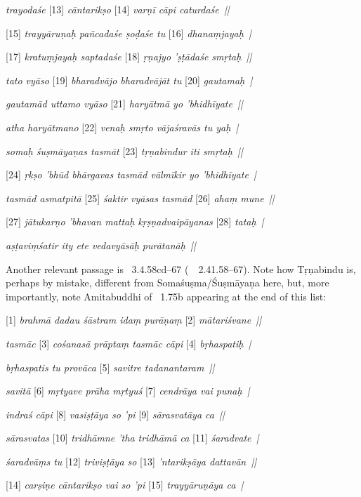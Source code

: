 {{  \textit{trayodaśe }[13]\textit{ cāntarikṣo }[14]\textit{ varṇī cāpi caturdaśe~|| } 
 
  [15]\textit{ trayyāruṇaḥ pañcadaśe ṣoḍaśe tu }[16]\textit{ dhanaṃjayaḥ~| } 
 
  [17]\textit{ kratuṃjayaḥ saptadaśe }[18]\textit{ ṛṇajyo 'ṣṭādaśe smṛtaḥ~|| } 
 
  \textit{tato vyāso }[19]\textit{ bharadvājo bharadvājāt tu }[20]\textit{ gautamaḥ~| } 
 
  \textit{gautamād uttamo vyāso }[21]\textit{ haryātmā yo 'bhidhīyate~|| } 
 
  \textit{atha haryātmano }[22]\textit{ venaḥ smṛto vājaśravās tu yaḥ~| } 
 
  \textit{somaḥ śuṣmāyaṇas tasmāt }[23]\textit{ tṛṇabindur iti smṛtaḥ~|| } 
 
  [24]\textit{ ṛkṣo 'bhūd bhārgavas tasmād vālmīkir yo 'bhidhīyate~| } 
 
  \textit{tasmād asmatpitā }[25]\textit{ śaktir vyāsas tasmād }[26]\textit{ ahaṃ mune~|| } 
 
  [27]\textit{ jātukarṇo 'bhavan mattaḥ kṛṣṇadvaipāyanas }[28]\textit{ tataḥ~| } 
 
  \textit{aṣṭaviṃśatir ity ete vedavyāsāḥ purātanāḥ~|| }
 
  
 
  Another relevant passage is \BRAHMANDAPUR\ 3.4.58cd--67 {\rm (}\similar\ \VAYUP\ 2.41.58--67{\rm )}.
  Note how Tṛṇabindu is, perhaps by mistake, different from Somaśuṣma/Śuṣmāyaṇa here,
  but, more importantly, note Amitabuddhi of \VSS\ 1.75b appearing at the end of this list:
  
 
  [1] \textit{brahmā dadau śāstram idaṃ purāṇaṃ }[2]\textit{ mātariśvane~|| } 
 
  \textit{tasmāc }[3]\textit{ cośanasā prāptaṃ tasmāc cāpi }[4]\textit{ bṛhaspatiḥ~| } 
 
  \textit{bṛhaspatis tu provāca }[5]\textit{ savitre tadanantaram~|| } 
 
  \textit{savitā }[6]\textit{ mṛtyave prāha mṛtyuś }[7]\textit{ cendrāya vai punaḥ~| } 
 
  \textit{indraś cāpi }[8]\textit{ vasiṣṭāya so 'pi }[9]\textit{ sārasvatāya ca~|| } 
 
  \textit{sārasvatas }[10]\textit{ tridhāmne 'tha tridhāmā ca }[11]\textit{ śaradvate~| } 
 
  \textit{śaradvāṃs tu }[12]\textit{ triviṣṭāya so }[13]\textit{ 'ntarikṣāya dattavān~|| } 
 
  [14]\textit{ carṣiṇe cāntarikṣo vai so 'pi }[15]\textit{ trayyāruṇāya ca~| } 
 
}}
